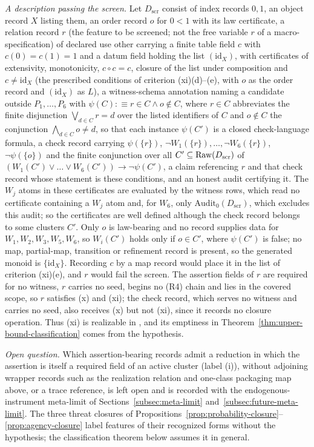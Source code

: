 \begin{remark}
\emph{A description passing the screen.} Let \(D_{\mathrm{scr}}\) consist of
index records \(0,1\), an object record \(X\) listing them, an order record \(o\) for
\(0<1\) with its law certificate, a relation record \(r\) (the feature to be screened; not the free variable \(r\) of a macro-specification) of declared use
other carrying a finite table field \(c\) with \(c(0)=c(1)=1\) and a datum field
holding the list \((\mathrm{id}_X)\), with
certificates of extensivity, monotonicity, \(c\circ c=c\), closure of the list
under composition and \(c\ne\mathrm{id}_X\) (the prescribed conditions of criterion (xi)(d)--(e), with \(o\) as the order record and \((\mathrm{id}_X)\) as \(L\)), a witness-schema annotation naming a
candidate outside \(P_1,\dots,P_6\) with \(\psi(C):\equiv r\in C\wedge o\notin
C\), where \(r\in C\) abbreviates the finite disjunction \(\bigvee_{d\in C}r=d\)
over the listed identifiers of \(C\) and \(o\notin C\) the conjunction
\(\bigwedge_{d\in C}o\neq d\), so that each instance \(\psi(C')\) is a closed
check-language formula, a check record carrying \(\psi(\{r\})\), \(\neg W_1(\{r\}),\dots,\neg
W_6(\{r\})\), \(\neg\psi(\{o\})\) and the finite conjunction over all
\(C'\subseteq\operatorname{Raw}\!\left(D_{\mathrm{scr}}\right)\) of \((W_1(C')\vee\dots\vee
W_6(C'))\rightarrow\neg\psi(C')\), a claim referencing \(r\) and that check
record whose statement is these conditions, and an honest audit certifying
it. The \(W_j\) atoms in these certificates are evaluated by the witness rows,
which read no certificate containing a \(W_j\) atom and, for \(W_6\), only
\(\mathrm{Audit}_0(D_{\mathrm{scr}})\), which excludes this audit; so the
certificates are well defined although the check record belongs to some
clusters \(C'\). Only \(o\) is law-bearing and no record supplies data for
\(W_1,W_2,W_3,W_5,W_6\), so \(W_i(C')\) holds only if \(o\in C'\), where
\(\psi(C')\) is false; no map, partial-map, transition or refinement record is
present, so the generated monoid is \(\{\mathrm{id}_X\}\). Recording \(c\) by
a map record would place it in the list of criterion (xi)(e), and \(r\) would
fail the screen. The assertion fields
of \(r\) are required for no witness, \(r\) carries no seed, begins no (R4)
chain and lies in the covered scope, so \(r\) satisfies (x) and (xi); the check record, which serves no witness and carries no seed, also receives (x) but not (xi), since it records no closure operation. Thus
(xi) is realizable in \FATCD{}, and its emptiness in
Theorem~\ref{thm:upper-bound-classification} comes from the hypothesis.

\emph{Open question.} Which assertion-bearing records admit a reduction in which the assertion is
itself a required field of an active cluster (label (i)), without
adjoining wrapper records such as the realization relation and one-class
packaging map above, or a trace reference, is left open and is
recorded with the endogenous-instrument meta-limit of
Sections~\ref{subsec:meta-limit} and~\ref{subsec:future-meta-limit}. The three
threat closures of
Propositions~\ref{prop:probability-closure}--\ref{prop:agency-closure} label
features of their recognized forms without the hypothesis; the classification
theorem below assumes it in general.
\end{remark}


